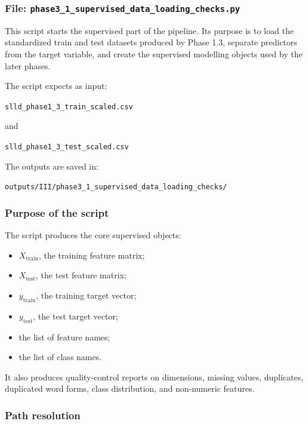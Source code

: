 \documentclass{ipgpmaster}
\begin{document}
\subsubsection{File: \texttt{phase3\_1\_supervised\_data\_loading\_checks.py}}

This script starts the supervised part of the pipeline. Its purpose is to load the standardized train and test datasets produced by Phase 1.3, separate predictors from the target variable, and create the supervised modelling objects used by the later phases.

The script expects as input:

\begin{center}
\texttt{slld\_phase1\_3\_train\_scaled.csv}
\end{center}

and

\begin{center}
\texttt{slld\_phase1\_3\_test\_scaled.csv}
\end{center}

The outputs are saved in:

\begin{center}
\texttt{outputs/III/phase3\_1\_supervised\_data\_loading\_checks/}
\end{center}

\subsubsection{Purpose of the script}

The script produces the core supervised objects:

\begin{itemize}
    \item \(X_{\text{train}}\), the training feature matrix;
    \item \(X_{\text{test}}\), the test feature matrix;
    \item \(y_{\text{train}}\), the training target vector;
    \item \(y_{\text{test}}\), the test target vector;
    \item the list of feature names;
    \item the list of class names.
\end{itemize}

It also produces quality-control reports on dimensions, missing values, duplicates, duplicated word forms, class distribution, and non-numeric features.

\subsubsection{Path resolution}
\end{document}
